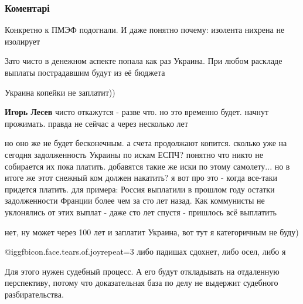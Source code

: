  
 
 
 
 
\subsubsection{Коментарі}
\label{sec:25_05_2018.fb.lesev_igor.1.mh17.cmt}

\begin{itemize} %
Конкретно к ПМЭФ подогнали. И даже понятно почему: изолента нихрена не изолирует

Зато чисто в денежном аспекте попала как раз Украина. При любом раскладе выплаты пострадавшим будут из её бюджета

\begin{itemize} %
Украина копейки не заплатит))

\textbf{Игорь Лесев} чисто откажутся - разве что. но это временно будет. начнут прожимать. правда не сейчас а через несколько лет


но оно же не будет бесконечным. а счета продолжают копится. сколько уже на
сегодня задолженность Украины по искам ЕСПЧ? понятно что никто не собирается их
пока платить. добавятся такие же иски по этому самолету... но в итоге же этот
снежный ком должен накатить? я вот про это - когда все-таки придется платить.
для примера: Россия выплатили в прошлом году остатки задолженности Франции
более чем за сто лет назад. Как коммунисты не уклонялись от этих выплат - даже
сто лет спустя - пришлось всё выплатить


нет, ну может через 100 лет и заплатит Украина, вот тут я категоричным не буду)

 @igg{fbicon.face.tears.of.joy}{repeat=3} либо падишах сдохнет, либо осел, либо я


Для этого нужен судебный процесс. А его будут откладывать на отдаленную
перспективу, потому что доказательная база по делу не выдержит судебного
разбирательства.

\end{itemize} %


\end{itemize}
